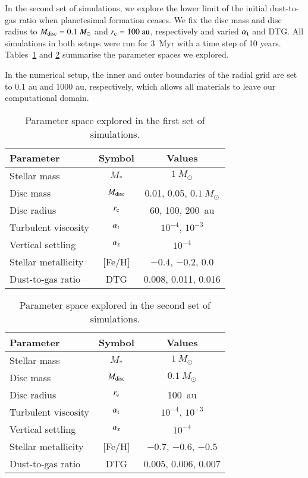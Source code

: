 \documentclass{aa}
\begin{document}
In the second set of simulations, we explore the lower limit of the initial dust-to-gas ratio when planetesimal formation ceases. We fix the disc mass and disc radius to $M_{\rm disc} = 0.1~M_{\odot}$ and $r_{\rm c} = 100~{\rm au}$, respectively and varied $\alpha_{\rm t}$ and DTG. All simulations in both setups were run for 3~Myr with a time step of 10 years. Tables~\ref{tab:initial_conditions_set1} and \ref{tab:initial_conditions_set2} summarise the parameter spaces we explored.

 In the numerical setup, the inner and outer boundaries of the radial grid are set to 0.1 au and 1000 au, respectively, which allows all materials to leave our computational domain.
 
\begin{table}
    \caption{Parameter space explored in the first set of simulations.}
    \label{tab:initial_conditions_set1}
    \centering
    \begin{tabular}{lcc}
    \hline\hline
        Parameter & Symbol & Values\\
        \hline
        Stellar mass & $M_*$ & $1~M_{\odot}$ \\
        Disc mass & $M_{\rm disc}$ & 0.01, 0.05, $0.1~M_{\odot}$ \\
        Disc radius & $r_{\rm c}$ & 60, 100, 200~au \\
        Turbulent viscosity & $\alpha_{\rm t}$ & $10^{-4}$, $10^{-3}$ \\
        Vertical settling & $\alpha_{\rm z}$ & $10^{-4}$ \\
        Stellar metallicity & {\rm [Fe/H]} & $-0.4$, $-0.2$, 0.0 \\
        Dust-to-gas ratio & DTG & 0.008, 0.011, 0.016 \\
        \hline
    \end{tabular}
\end{table}

\begin{table}
    \caption{Parameter space explored in the second set of simulations.}
    \label{tab:initial_conditions_set2}
    \centering
    \begin{tabular}{lcc}
    \hline\hline
        Parameter & Symbol & Values \\
        \hline
        Stellar mass & $M_*$ & $1~M_{\odot}$ \\
        Disc mass & $M_{\rm disc}$ & $0.1~M_{\odot}$\\
        Disc radius & $r_{\rm c}$ & 100~au\\
        Turbulent viscosity & $\alpha_{\rm t}$ & $10^{-4}$, $10^{-3}$\\
        Vertical settling & $\alpha_{\rm z}$ & $10^{-4}$ \\
        Stellar metallicity & {\rm [Fe/H]} & $-0.7$, $-0.6$, $-0.5$ \\
        Dust-to-gas ratio & DTG & 0.005, 0.006, 0.007 \\
        \hline
    \end{tabular}
\end{table}
\end{document}
